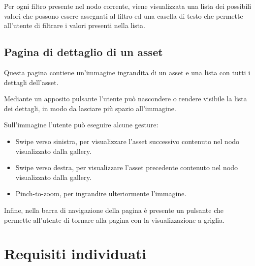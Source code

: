 Per ogni filtro presente nel nodo corrente, viene visualizzata una lista dei possibili valori che possono essere assegnati al filtro ed una casella di testo che permette all'utente di filtrare i valori presenti nella lista.

\subsection{Pagina di dettaglio di un asset}\label{sec:pag-dettaglio-asset}

Questa pagina contiene un'immagine ingrandita di un asset e una lista con tutti i dettagli dell'asset.

Mediante un apposito pulsante l'utente può nascondere o rendere visibile la lista dei dettagli, in modo da lasciare più spazio all'immagine.

Sull'immagine l'utente può eseguire alcune gesture:
\begin{itemize}
\item Swipe verso sinistra, per visualizzare l'asset successivo contenuto nel nodo visualizzato dalla gallery.
\item Swipe verso destra, per visualizzare l'asset precedente contenuto nel nodo visualizzato dalla gallery.
\item Pinch-to-zoom, per ingrandire ulteriormente l'immagine.
\end{itemize}

Infine, nella barra di navigazione della pagina è presente un pulsante che permette all'utente di tornare alla pagina con la visualizzazione a griglia.


\section{Requisiti individuati}

